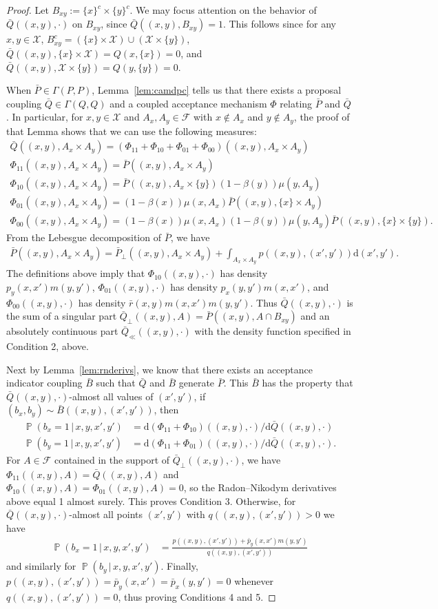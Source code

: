 \documentclass[aihp]{imsart}
\theoremstyle{plain}
\theoremstyle{remark}
\theoremstyle{definition} \newtheorem{example}{Example}
\newcommand{\eq}[1]{\begin{align*}#1\end{align*}} %
\newcommand{\ec}[1]{\begin{gather*}#1\end{gather*}} %
\renewcommand{\P}{\operatorname{\mathbb{P}}}
\newcommand{\scrF}{\mathscr{F}}
\newcommand{\calX}{\mathcal{X}}
\newcommand{\g}{\, | \,}
\newcommand{\diff}{\mathrm{d} } %
\newcommand{\bp}{\bar P}
\newcommand{\bq}{\bar Q}
\newcommand{\bb}{\bar B}
\newcommand{\sx}{\{ x \}}
\newcommand{\sy}{\{ y \}}
\newcommand{\xy}{(x,y)}
\newcommand{\xyp}{(x',y')}
\newcommand{\bxy}{(b_x,b_y)}
\newcommand{\axy}{A_x \times A_y}
\begin{document}
\begin{proof}
Let $B_{xy} := \sx^c \times \sy^c$.
We may focus attention on the behavior of $\bq(\xy, \cdot)$ on $B_{xy}$,
since ${\bq(\xy, B_{xy}) = 1}$. This follows since for any $x,y \in \calX$,
$B_{xy}^c = (\sx \times \calX) \cup (\calX \times \sy)$,
$\bq(\xy, \sx \times \calX) = Q(x, \sx) = 0$, and
$\bq(\xy, \calX \times \sy) = Q(y, \sy) = 0$.

When $\bp \in \Gamma(P,P)$, Lemma~\ref{lem:camdpc} tells us that there exists a proposal
coupling $\bq \in \Gamma(Q,Q)$ and a coupled acceptance mechanism $\Phi$ relating $\bp$ and $\bq$.
In particular, for $x,y \in \calX$ and $A_x, A_y \in \scrF$ with $x \not \in A_x$ and $y \not
\in A_y$, the proof of that Lemma shows that we can use the following measures:
\ec{
	\bq(\xy, \axy) = (\Phi_{11} + \Phi_{10} + \Phi_{01} + \Phi_{00})(\xy, \axy) \\
	\Phi_{11}(\xy, \axy) = \bp ( \xy, \axy ) \\
	\Phi_{10}(\xy, \axy) = \bp( \xy, A_x \times \sy) (1 - \beta(y))  \mu(y, A_y) \\
	\Phi_{01}(\xy, \axy) = (1 - \beta(x)) \mu(x, A_x) \bp( \xy, \sx \times A_y) \\
	\Phi_{00}(\xy, \axy) = (1 - \beta(x)) \mu(x, A_x) (1-\beta(y)) \mu(y, A_y) \bp(\xy, \sx \times \sy).
}
From the Lebesgue decomposition of $\bp$, we have
\eq{
	\bp ( \xy, \axy ) = \bp_\perp(\xy,\axy) + \int_{\axy} p(\xy,\xyp) \diff \xyp.
}
The definitions above imply that $\Phi_{10}(\xy, \cdot)$ has density $p_y(x, x') m(y,y')$,
$\Phi_{01}(\xy, \cdot)$ has density $p_x(y, y') m(x,x')$, and $\Phi_{00}(\xy, \cdot)$ has density
$\bar r(x,y) m(x,x') m(y,y')$. Thus $\bq(\xy, \cdot)$ is the sum of a singular part ${\bq_\perp(\xy,
	A)} = {\bp(\xy, A \cap B_{xy})}$ and an absolutely continuous part $\bq_\ll(\xy, \cdot)$ with the
density function specified in Condition 2, above.

Next by Lemma~\ref{lem:rnderivs}, we know that there exists an acceptance indicator coupling $\bb$
such that $\bq$ and $\bb$ generate $\bp$. This $\bb$ has the property that $\bq(\xy, \cdot)$-almost
all values of $\xyp$, if $\bxy \sim \bb(\xy,\xyp)$, then
\eq{
	\P(b_x=1 \g x,y,x',y') &= \diff (\Phi_{11} + \Phi_{10})(\xy, \cdot) / \diff \bq(\xy, \cdot) \\
	\P(b_y=1 \g x,y,x',y') & = \diff (\Phi_{11} + \Phi_{01})(\xy, \cdot) / \diff \bq(\xy, \cdot).
}
For $A \in \scrF$ contained in the support of $\bq_\perp(\xy, \cdot)$, we have $\Phi_{11}(\xy, A) =
\bq(\xy, A)$ and ${\Phi_{10}(\xy, A)} = {\Phi_{01}(\xy, A) = 0}$, so the Radon--Nikodym derivatives
above equal 1 almost surely. This proves Condition 3. Otherwise, for $\bq(\xy, \cdot)$-almost all
points $\xyp$ with $q(\xy, \xyp) > 0$ we have
\eq{
	\P(b_x=1 \g x,y,x',y')
	& = \frac{p(\xy, \xyp) + \bar p_y(x, x') m(y,y')}{q(\xy,\xyp)}
}
and similarly for $\P(b_y \g x,y,x',y')$.
Finally, $p(\xy, \xyp) = \bar p_y(x,x') = \bar p_x(y,y') = 0$ whenever ${q(\xy, \xyp) = 0}$,
thus proving Conditions 4 and 5.
\end{proof}
\end{document}
